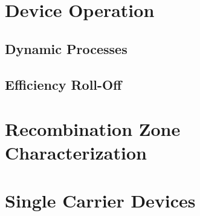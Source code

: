 \documentclass[../thesis.tex]{subfiles}
\begin{document}
\section{Device Operation}
\subsection{Dynamic Processes}
\subsection{Efficiency Roll-Off}

\section{Recombination Zone Characterization}

\section{Single Carrier Devices}



\end{document}
